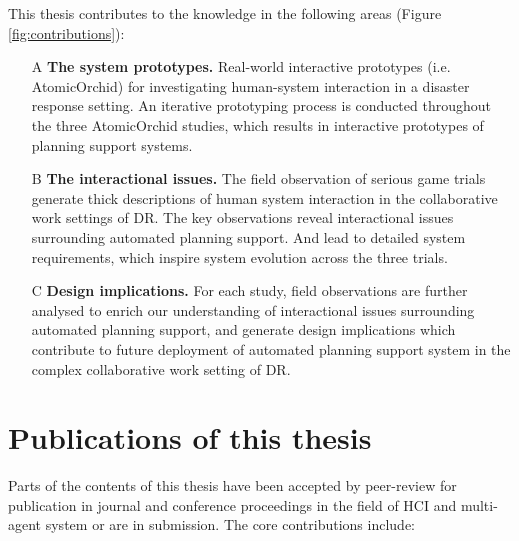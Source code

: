 This thesis contributes to the knowledge in the following areas (Figure \ref{fig:contributions}): \\

\begin{enumerate}
  \item[A] \textbf{The system prototypes.} Real-world interactive prototypes (i.e. AtomicOrchid) for investigating human-system interaction in a disaster response setting. An iterative prototyping process is conducted throughout the three AtomicOrchid studies, which results in interactive prototypes of planning support systems. 
  
  \item[B] \textbf{The interactional issues.} The field observation of serious game trials generate thick descriptions of human system interaction in the collaborative work settings of \ac{DR}. The key observations reveal interactional issues surrounding automated planning support. And lead to detailed system requirements, which inspire system evolution across the three trials.
  
  \item[C] \textbf{Design implications.} For each study, field observations are further analysed to enrich our understanding of interactional issues surrounding automated planning support, and generate design implications which contribute to future deployment of automated planning support system in the complex collaborative work setting of \ac{DR}. 
\end{enumerate}


\section{Publications of this thesis} 
Parts of the contents of this thesis have been accepted by peer-review for publication in journal and conference proceedings in the field of \ac{HCI} and multi-agent system or are in submission. The core contributions include: \\


